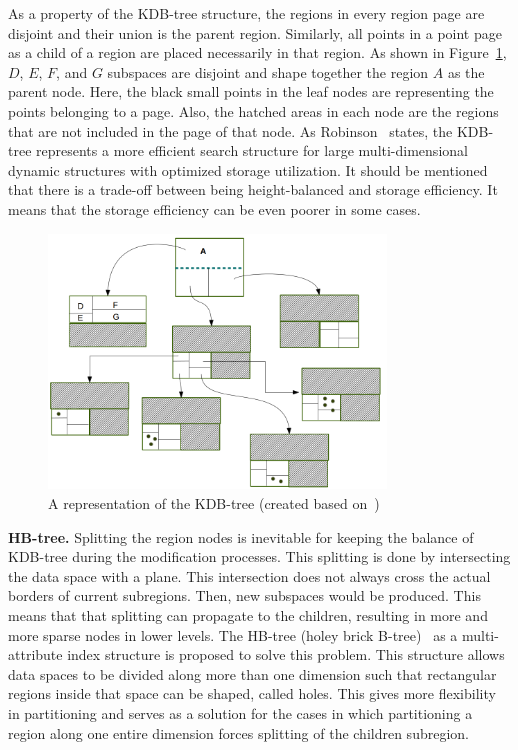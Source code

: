 \documentclass[a4paper,12pt]{article}
\begin{document}
As a property of the KDB-tree structure, the regions in every region page are disjoint and their union is the parent region. %
Similarly, all points in a point page as a child of a region are placed necessarily in that region.
As shown in Figure~\ref{figkdbtree}, $D$, $E$, $F$, and $G$ subspaces are disjoint and shape together the region $A$ as the parent node. Here, the black small points in the leaf nodes are representing the points belonging to a page. Also, the hatched areas in each node are the regions that are not included in the page of that node. 
As Robinson~\cite{kdbtree} states, the KDB-tree represents a more efficient search structure for large multi-dimensional dynamic structures with optimized storage utilization. It should be mentioned that there is a trade-off between being height-balanced and storage efficiency. It means that the storage efficiency can be even poorer in some cases.

\begin{figure}
\centering
\includegraphics[width=0.8\textwidth]{kdbtree}
\caption{A representation of the KDB-tree (created based on~\cite{kdbtree})}
\label{figkdbtree}
\end{figure}

\textbf{HB-tree.} 
Splitting the region nodes is inevitable for keeping the balance of KDB-tree during the modification processes. This splitting is done by intersecting the data space with a plane. This intersection does not always cross the actual borders of current subregions. Then, new subspaces would be produced. This means that that splitting can propagate to the children, resulting in more and more sparse nodes in lower levels. The HB-tree (holey brick B-tree)~\cite{hbtree1} as a multi-attribute index structure is proposed to solve this problem. This structure allows data spaces to be divided along more than one dimension such that rectangular regions inside that space can be shaped, called holes.
This gives more flexibility in partitioning and serves as a solution for the cases in which partitioning a region along one entire dimension forces splitting of the children subregion. 
\end{document}
